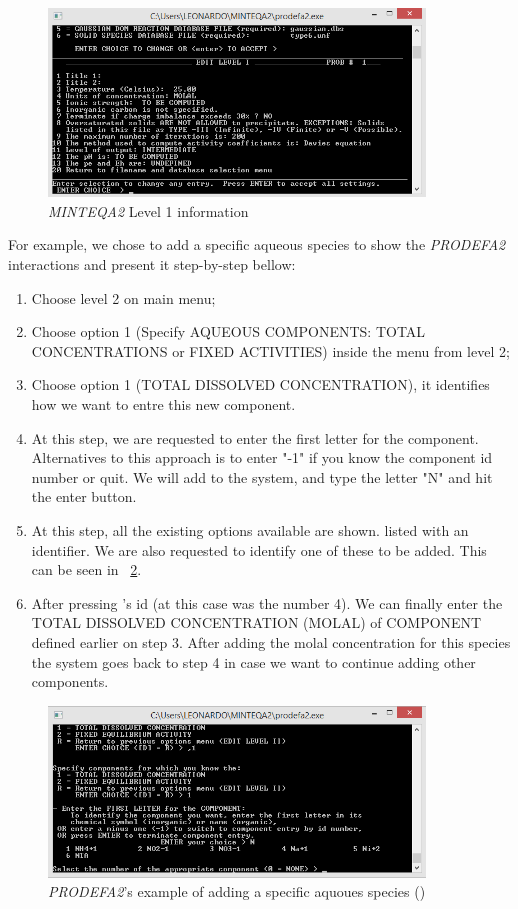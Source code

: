 \begin{figure}[ht!]
\centering
\includegraphics[width=100mm]{figures/minteq-level1.png}
\caption{\emph{MINTEQA2} Level 1 information}
\label{minteq:level1}
\end{figure}


For example, we chose to add a specific aqueous species to show the \emph{PRODEFA2} interactions and present it step-by-step bellow:

\begin{enumerate}
\item Choose level 2 on main menu;
\item Choose option 1 (Specify AQUEOUS COMPONENTS: TOTAL CONCENTRATIONS or FIXED ACTIVITIES) inside the menu from level 2;
\item Choose option 1 (TOTAL DISSOLVED CONCENTRATION), it identifies how we want to entre this new component.
\item At this step, we are requested to enter the first letter for the component. Alternatives to this approach is to enter "-1" if you know the component id number or quit. We will add  to the system, and type the letter "N" and hit the enter button.
\item At this step, all the existing options available are shown. listed with an identifier. We are also requested to identify one of these to be added. This can be seen in ~\ref{minteq:Na+}.
\item After pressing 's id (at this case was the number 4). We can finally enter the TOTAL DISSOLVED CONCENTRATION (MOLAL) of COMPONENT defined earlier on step 3. After adding the molal concentration for this species the system goes back to step 4 in case we want to continue adding other components.
\end{enumerate}

\begin{figure}[ht!]
\centering
\includegraphics[width=100mm]{figures/minteq-Na+.png}
\caption{\emph{PRODEFA2}'s example of adding a specific aquoues species () }
\label{minteq:Na+}
\end{figure}

